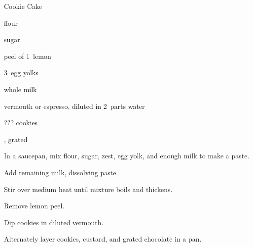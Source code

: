 \begin{recipe}{Cookie Cake\FIXME}{}{}

\begin{ingredients}
\item {} flour
\item \C{\half} sugar
\item peel of 1~lemon
\item 3~egg yolks
\item {} whole milk
\item vermouth or espresso, diluted in 2~parts water
\item ??? cookies
\item {}, grated
\end{ingredients}

\begin{directions}
\item In a saucepan, mix flour, sugar, zest, egg yolk, and enough milk to make a paste.
\item Add remaining milk, dissolving paste.
\item Stir over medium heat until mixture boils and thickens.
\item Remove lemon peel.
\item Dip cookies in diluted vermouth.
\item Alternately layer cookies, custard, and grated chocolate in a pan.
\end{directions}

\end{recipe}
